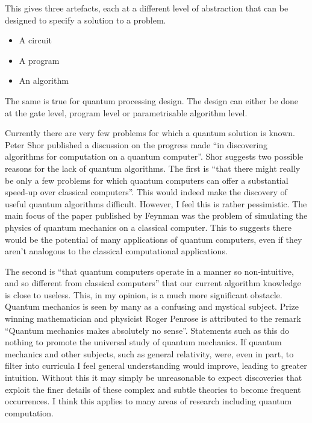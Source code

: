 This gives three artefacts, each at a different level of abstraction that can be designed to specify a solution to a problem.
\begin{itemize}
 \item A circuit
 \item A program
 \item An algorithm
\end{itemize}

The same is true for quantum processing design.
The design can either be done at the gate level, program level or parametrisable algorithm level.

Currently there are very few problems for which a quantum solution is known.
Peter Shor published a discussion on the progress made ``in discovering algorithms for computation on a quantum computer''\cite{Shor:2004:PQA:1032132.1032149}.
Shor suggests two possible reasons for the lack of quantum algorithms.
The first is ``that there might really be only a few problems for which quantum computers can offer a substantial speed-up over classical computers''\cite{Shor:2004:PQA:1032132.1032149}.
This would indeed make the discovery of useful quantum algorithms difficult.
However, I feel this is rather pessimistic.
The main focus of the paper published by Feynman\cite{Feynman82simulatingphysics} was the problem of simulating the physics of quantum mechanics on a classical computer.
This to suggests there would be the potential of many applications of quantum computers, even if they aren't analogous to the classical computational applications.

The second is ``that quantum computers operate in a manner so non-intuitive, and so different from classical computers''\cite{Shor:2004:PQA:1032132.1032149} that our current algorithm knowledge is close to useless.
This, in my opinion, is a much more significant obstacle.
Quantum mechanics is seen by many as a confusing and mystical subject.
Prize winning mathematician and physicist Roger Penrose is attributed to the remark ``Quantum mechanics makes absolutely no sense''.
Statements such as this do nothing to promote the universal study of quantum mechanics.
If quantum mechanics and other subjects, such as general relativity, were, even in part, to filter into curricula I feel general understanding would improve, leading to greater intuition.
Without this it may simply be unreasonable to expect discoveries that exploit the finer details of these complex and subtle theories to become frequent occurrences.
I think this applies to many areas of research including quantum computation.

